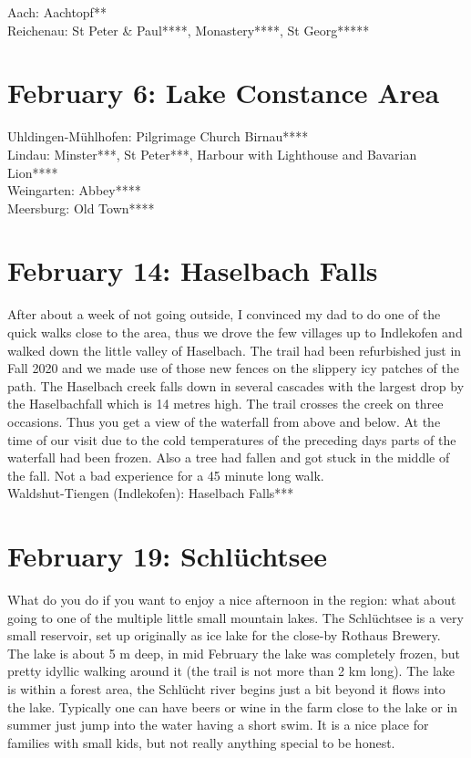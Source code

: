 Aach: Aachtopf**\\
Reichenau: St Peter \& Paul****, Monastery****, St Georg*****\\

\section{February 6: Lake Constance Area}
\label{2021:LakeConstance}

Uhldingen-M\"uhlhofen: Pilgrimage Church Birnau****\\
Lindau: Minster***, St Peter***, Harbour with Lighthouse and Bavarian Lion****\\
Weingarten: Abbey****\\
Meersburg: Old Town****

\section{February 14: Haselbach Falls}
\label{2021:Haselbach}

After about a week of not going outside, I convinced my dad to do one of the quick walks close to the area, thus we drove the few villages up to Indlekofen and walked down the little valley of Haselbach. The trail had been refurbished just in Fall 2020 and we made use of those new fences on the slippery icy patches of the path. The Haselbach creek falls down in several cascades with the largest drop by the Haselbachfall which is 14 metres high. The trail crosses the creek on three occasions. Thus you get a view of the waterfall from above and below. At the time of our visit due to the cold temperatures of the preceding days parts of the waterfall had been frozen. Also a tree had fallen and got stuck in the middle of the fall. Not a bad experience for a 45 minute long walk.\\

Waldshut-Tiengen (Indlekofen): Haselbach Falls***

\section{February 19: Schl\"uchtsee}
\label{2021:Schluechtsee}

What do you do if you want to enjoy a nice afternoon in the region: what about going to one of the multiple little small mountain lakes. The Schl\"uchtsee is a very small reservoir, set up originally as ice lake for the close-by Rothaus Brewery. The lake is about 5 m deep, in mid February the lake was completely frozen, but pretty idyllic walking around it (the trail is not more than 2 km long). The lake is within a forest area, the Schl\"ucht river begins just a bit beyond it flows into the lake. Typically one can have beers or wine in the farm close to the lake or in summer just jump into the water having a short swim. It is a nice place for families with small kids, but not really anything special to be honest.\\

